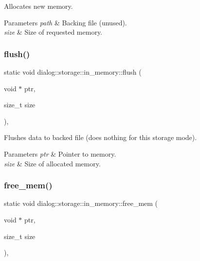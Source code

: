 Allocates new memory.


\begin{DoxyParams}{Parameters}
{\em path} & Backing file (unused). \\
\hline
{\em size} & Size of requested memory. \\
\hline
\end{DoxyParams}
\mbox{\label{structdialog_1_1storage_1_1in__memory_a8c6edb151f7f3420cb14b567b5c88c64}} 
\subsubsection{\texorpdfstring{flush()}{flush()}}
{\footnotesize\ttfamily static void dialog\+::storage\+::in\+\_\+memory\+::flush (\begin{DoxyParamCaption}\item[{void $\ast$}]{ptr,  }\item[{size\+\_\+t}]{size }\end{DoxyParamCaption})\hspace{0.3cm}{\ttfamily [inline]}, {\ttfamily [static]}}

Flushes data to backed file (does nothing for this storage mode).


\begin{DoxyParams}{Parameters}
{\em ptr} & Pointer to memory. \\
\hline
{\em size} & Size of allocated memory. \\
\hline
\end{DoxyParams}
\mbox{\label{structdialog_1_1storage_1_1in__memory_af1a8517c282999c0f80fda59de3483d7}} 
\subsubsection{\texorpdfstring{free\+\_\+mem()}{free\_mem()}}
{\footnotesize\ttfamily static void dialog\+::storage\+::in\+\_\+memory\+::free\+\_\+mem (\begin{DoxyParamCaption}\item[{void $\ast$}]{ptr,  }\item[{size\+\_\+t}]{size }\end{DoxyParamCaption})\hspace{0.3cm}{\ttfamily [inline]}, {\ttfamily [static]}}

